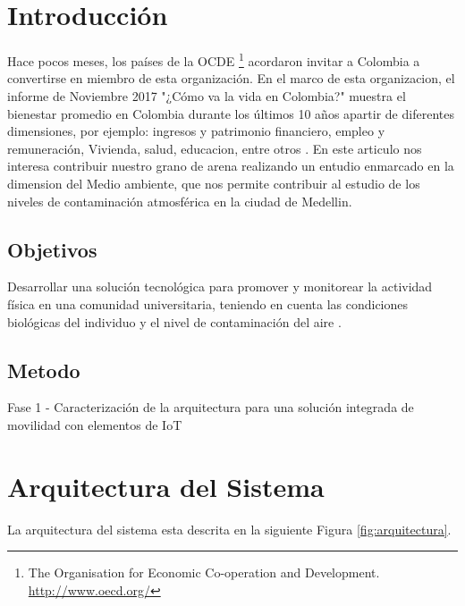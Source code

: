 \documentclass[runningheads,a4paper]{llncs}
\begin{document}
\section{Introducción}

Hace pocos meses, los países de la OCDE \footnote{The Organisation for Economic Co-operation and Development. \url{http://www.oecd.org/}} acordaron invitar a Colombia a convertirse en miembro de esta organización. En el marco de esta organizacion, el informe de Noviembre 2017 "¿Cómo va la vida en Colombia?" muestra el bienestar promedio en Colombia durante los últimos 10 años apartir de diferentes dimensiones, por ejemplo: ingresos y patrimonio financiero, empleo y remuneración, Vivienda, salud, educacion, entre otros \cite{vida_colombia}. En este articulo nos interesa contribuir nuestro grano de arena realizando un entudio enmarcado en la dimension del Medio ambiente, que nos permite contribuir al estudio de  los niveles de contaminación atmosférica en la ciudad de Medellin. 


\subsection{Objetivos}
Desarrollar una solución tecnológica para promover y monitorear la actividad física en una comunidad universitaria, teniendo en cuenta las condiciones biológicas del individuo y el nivel de contaminación del aire \cite{url_siata}.

\subsection{Metodo}

	Fase 1 - Caracterización de la arquitectura para una solución integrada de movilidad con elementos de IoT
	
	
	



\section{Arquitectura del Sistema}

La arquitectura del sistema esta descrita en la siguiente Figura \ref{fig:arquitectura}.
\end{document}
